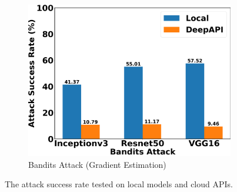 \begin{figure}[tbp]
\begin{subfigure}[b]{0.6\textwidth}
    \centering
    \includegraphics[width=\textwidth]{figures/chapter_classification/bandits_attack_success_rate.png}
    \caption{Bandits Attack (Gradient Estimation)}
    \label{fig:bandits_suc}
\end{subfigure}
\caption{The attack success rate tested on local models and cloud APIs.}
\label{fig.suc}
\end{figure}

